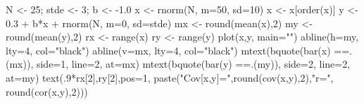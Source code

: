 \begin{Schunk}
\begin{Sinput}
 N <- 25; stde <- 3; b <- -1.0
 x <- rnorm(N, m=50, sd=10)
 x <- x[order(x)]
 y <- 0.3 + b*x + rnorm(N, m=0, sd=stde)
 mx <- round(mean(x),2)
 my <- round(mean(y),2)
 rx <- range(x)
 ry <- range(y)
 plot(x,y, main="")
 abline(h=my, lty=4, col="black")
 abline(v=mx, lty=4, col="black")
 mtext(bquote(bar(x) ==.(mx)), side=1, line=2, at=mx)
 mtext(bquote(bar(y) ==.(my)), side=2, line=2, at=my)
 text(.9*rx[2],ry[2],pos=1, paste("Cov[x,y]=",round(cov(x,y),2),"\n r=", round(cor(x,y),2)))
\end{Sinput}
\end{Schunk}
